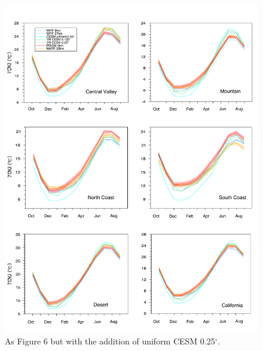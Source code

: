 \begin{figure}
\begin{center}
\includegraphics[width=6in]{supplement/trd_t2avg_allzones_with_uniform_CESM.pdf}
\caption{As Figure 6 but with the addition of uniform CESM 0.25$^\circ$.}
\end{center}
\end{figure}

